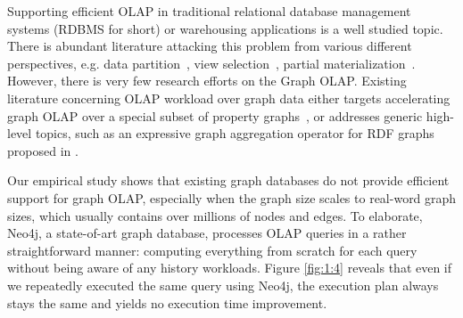 Supporting efficient OLAP in traditional relational database management systems (RDBMS for short) \cite{DBLP:reference/db/2009} or warehousing applications is a well studied topic. There is abundant literature attacking this problem from various different perspectives, e.g. data partition~\cite{DBLP:conf/ismis/CuzzocreaL12}, view selection~\cite{DBLP:books/igi/Taniar10/LawrenceR10}, partial materialization~\cite{DBLP:journals/kais/DrzadzewskiT16}. However, there is very few research efforts on the Graph OLAP. Existing literature concerning OLAP workload over graph data either targets accelerating graph OLAP over a special subset of property graphs~\cite{DBLP:conf/sigmod/ZhaoLXH11}, or addresses generic high-level topics, such as an expressive graph aggregation operator for RDF graphs proposed in \cite{DBLP:conf/esws/MaaliCD15}. 


Our empirical study shows that existing graph databases do not provide efficient support for graph OLAP, especially when the graph size scales to real-word graph sizes, which usually contains over millions of nodes and edges. %
To elaborate, Neo4j, a state-of-art graph database, processes OLAP queries in a rather straightforward manner: computing everything from scratch for each query without being aware of any history workloads. Figure \ref{fig:1:4} reveals that even if we repeatedly executed the same query using Neo4j, the execution plan always stays the same and yields no execution time improvement.

